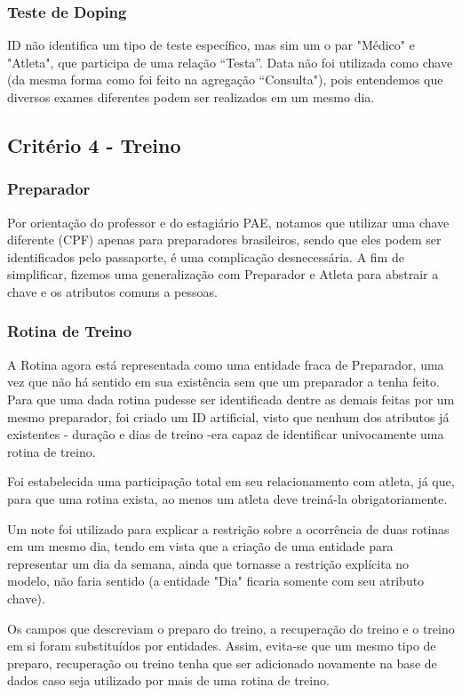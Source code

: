 \documentclass[12pt,a4paper]{article}
\begin{document}
\subsubsection{Teste de Doping}
    ID não identifica um tipo de teste específico, mas sim um o par "Médico" e "Atleta", que participa de uma relação “Testa”. Data não foi utilizada como chave (da mesma forma como foi feito na agregação “Consulta"), pois entendemos que diversos exames diferentes podem ser realizados em um mesmo dia.

\subsection{Critério 4 - Treino}
\subsubsection{Preparador}
      Por orientação do professor e do estagiário PAE, notamos que utilizar uma chave diferente (CPF) apenas para preparadores brasileiros, sendo que eles podem ser identificados pelo passaporte, é uma complicação desnecessária. A fim de simplificar, fizemos uma generalização com Preparador e Atleta para abstrair a chave e os atributos comuns a pessoas.  

\subsubsection{Rotina de Treino}

    A Rotina agora está representada como uma entidade fraca de Preparador, uma vez que não há sentido em sua existência sem que um preparador a tenha feito. Para que uma dada rotina pudesse ser identificada dentre as demais feitas por um mesmo preparador, foi criado um ID artificial, visto que nenhum dos atributos já existentes - duração e dias de treino -era capaz de identificar univocamente uma rotina de treino. \par
    Foi estabelecida uma participação total em seu relacionamento com atleta, já que, para que uma rotina exista, ao menos um atleta deve treiná-la obrigatoriamente. \par
    Um note foi utilizado para explicar a restrição sobre a ocorrência de duas rotinas em um mesmo dia, tendo em vista que a criação de uma entidade para representar um dia da semana, ainda que tornasse a restrição explícita no modelo, não faria sentido (a entidade "Dia" ficaria somente com seu atributo chave). \par
    Os campos que descreviam o preparo do treino, a recuperação do treino e o treino em si foram substituídos por entidades. Assim, evita-se que um mesmo tipo de preparo, recuperação ou treino tenha que ser adicionado novamente na base de dados caso seja utilizado por mais de uma rotina de treino. 
\end{document}
